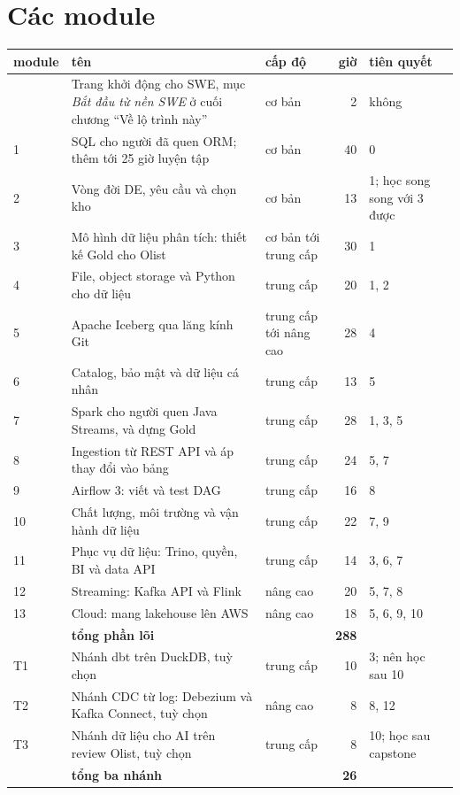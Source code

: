 \documentclass[11pt,a4paper,oneside]{report}
\newcommand{\thd}[1]{\textbf{\sffamily\small #1}}
\begin{document}
\section{Các module}
\begin{xltabular}{\textwidth}{@{}l L P{2.6cm} r P{2.6cm}@{}}
\toprule
\thd{module} & \thd{tên} & \thd{cấp độ} & \thd{giờ} & \thd{tiên quyết} \\
\midrule
\endhead
\bottomrule
{} & Trang khởi động cho SWE, mục \textit{Bắt đầu từ nền SWE} ở cuối chương ``Về lộ trình này'' & cơ bản & 2 & không \\
1 & SQL cho người đã quen ORM; thêm tới 25 giờ luyện tập & cơ bản & 40 & 0 \\
2 & Vòng đời DE, yêu cầu và chọn kho & cơ bản & 13 & 1; học song song với 3 được \\
3 & Mô hình dữ liệu phân tích: thiết kế Gold cho Olist & cơ bản tới trung cấp & 30 & 1 \\
4 & File, object storage và Python cho dữ liệu & trung cấp & 20 & 1, 2 \\
5 & Apache Iceberg qua lăng kính Git & trung cấp tới nâng cao & 28 & 4 \\
6 & Catalog, bảo mật và dữ liệu cá nhân & trung cấp & 13 & 5 \\
7 & Spark cho người quen Java Streams, và dựng Gold & trung cấp & 28 & 1, 3, 5 \\
8 & Ingestion từ REST API và áp thay đổi vào bảng & trung cấp & 24 & 5, 7 \\
9 & Airflow 3: viết và test DAG & trung cấp & 16 & 8 \\
10 & Chất lượng, môi trường và vận hành dữ liệu & trung cấp & 22 & 7, 9 \\
11 & Phục vụ dữ liệu: Trino, quyền, BI và data API & trung cấp & 14 & 3, 6, 7 \\
12 & Streaming: Kafka API và Flink & nâng cao & 20 & 5, 7, 8 \\
13 & Cloud: mang lakehouse lên AWS & nâng cao & 18 & 5, 6, 9, 10 \\
\midrule
 & \textbf{tổng phần lõi} & & \textbf{288} & \\
\midrule
T1 & Nhánh dbt trên DuckDB, tuỳ chọn & trung cấp & 10 & 3; nên học sau 10 \\
T2 & Nhánh CDC từ log: Debezium và Kafka Connect, tuỳ chọn & nâng cao & 8 & 8, 12 \\
T3 & Nhánh dữ liệu cho AI trên review Olist, tuỳ chọn & trung cấp & 8 & 10; học sau capstone \\
\midrule
 & \textbf{tổng ba nhánh} & & \textbf{26} & \\
\end{xltabular}
\end{document}
